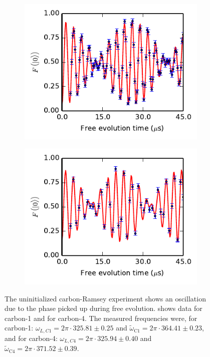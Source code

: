 \begin{figure}[htbp]
    \begin{subfigure}[t]{0.49\textwidth}\centering
        \caption{}
        \includegraphics{Img/CarbonRamsey_C1.pdf}
        \label{fig:CR_C1}
    \end{subfigure}
    \begin{subfigure}[t]{0.49\textwidth}\centering
        \caption{}
        \includegraphics{Img/CarbonRamsey_C4.pdf}
        \label{fig:CR_C4}
    \end{subfigure}
    \caption{The uninitialized carbon-Ramsey experiment shows an oscillation due to the phase picked up during free evolution.
     shows data for carbon-1 and  for carbon-4.
    The measured frequencies were, for carbon-1: $\omega_{L,C1} = 2\pi\cdot 325.81 \pm 0.25$ and  $\tilde \omega_{\mathrm{C1}}= 2\pi\cdot 364.41 \pm 0.23$, and for carbon-4: $\omega_{L,C4} =  2\pi\cdot 325.94 \pm 0.40$ and $\tilde \omega_{\mathrm{C4}} = 2\pi\cdot 371.52 \pm 0.39 $.}
    \label{fig:Uninitialized_carbon_ramsey}
\end{figure}

